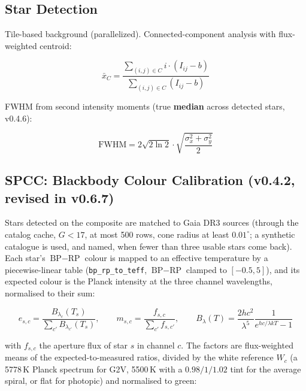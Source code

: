 \documentclass[11pt,a4paper]{article}
\newcommand{\code}[1]{\texttt{\small #1}}
\begin{document}
    \subsection{Star Detection}
    \label{sec:star_detection}

    Tile-based background (parallelized). Connected-component analysis with flux-weighted centroid:

    \begin{equation}
        \bar{x}_C = \frac{\sum_{(i,j) \in C} i \cdot (I_{ij} - b)}{\sum_{(i,j) \in C} (I_{ij} - b)}
    \end{equation}

    FWHM from second intensity moments (true \textbf{median} across detected stars, v0.4.6):

    \begin{equation}
        \text{FWHM} = 2\sqrt{2\ln 2} \cdot \sqrt{\frac{\sigma_x^2 + \sigma_y^2}{2}}
    \end{equation}

    \subsection{SPCC: Blackbody Colour Calibration (v0.4.2, revised in v0.6.7)}
    \label{sec:spcc_math}

    Stars detected on the composite are matched to Gaia DR3 sources (through the catalog cache, $G < 17$, at most 500 rows, cone radius at least $0.01^{\circ}$; a synthetic catalogue is used, and named, when fewer than three usable stars come back). Each star's $\text{BP}-\text{RP}$ colour is mapped to an effective temperature by a piecewise-linear table (\code{bp\_rp\_to\_teff}, $\text{BP}-\text{RP}$ clamped to $[-0.5, 5]$), and its expected colour is the Planck intensity at the three channel wavelengths, normalised to their sum:

    \begin{equation}
        e_{s,c} = \frac{B_{\lambda_c}(T_s)}{\sum_{c'} B_{\lambda_{c'}}(T_s)}, \qquad
        m_{s,c} = \frac{f_{s,c}}{\sum_{c'} f_{s,c'}}, \qquad
        B_\lambda(T) = \frac{2hc^2}{\lambda^5} \frac{1}{e^{hc/\lambda k T} - 1}
    \end{equation}

    with $f_{s,c}$ the aperture flux of star $s$ in channel $c$. The factors are flux-weighted means of the expected-to-measured ratios, divided by the white reference $W_c$ (a 5778\,K Planck spectrum for G2V, 5500\,K with a $0.98/1/1.02$ tint for the average spiral, or flat for photopic) and normalised to green:
\end{document}
